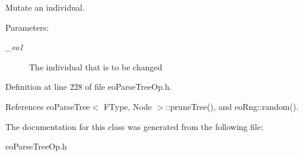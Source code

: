 Mutate an individual. 

\begin{Desc}
\item[Parameters:]
\begin{description}
\item[{\em \_\-eo1}]The individual that is to be changed \end{description}
\end{Desc}


Definition at line 228 of file eo\-Parse\-Tree\-Op.h.

References eo\-Parse\-Tree$<$ FType, Node $>$::prune\-Tree(), and eo\-Rng::random().

The documentation for this class was generated from the following file:\begin{CompactItemize}
\item 
eo\-Parse\-Tree\-Op.h\end{CompactItemize}

